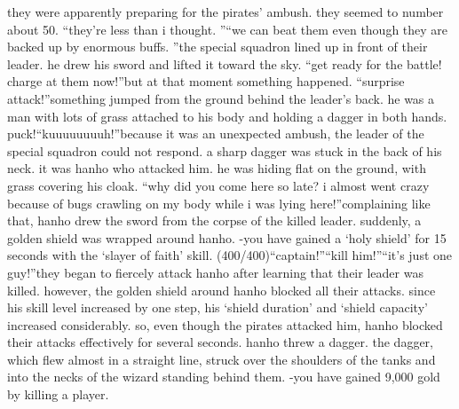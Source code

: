  they were apparently preparing for the pirates’ ambush.
 they seemed to number about 50.
“they’re less than i thought.
”“we can beat them even though they are backed up by enormous buffs.
”the special squadron lined up in front of their leader.
 he drew his sword and lifted it toward the sky.
“get ready for the battle! charge at them now!”but at that moment something happened.
“surprise attack!”something jumped from the ground behind the leader’s back.
 he was a man with lots of grass attached to his body and holding a dagger in both hands.
puck!“kuuuuuuuuh!”because it was an unexpected ambush, the leader of the special squadron could not respond.
 a sharp dagger was stuck in the back of his neck.
it was hanho who attacked him.
 he was hiding flat on the ground, with grass covering his cloak.
“why did you come here so late? i almost went crazy because of bugs crawling on my body while i was lying here!”complaining like that, hanho drew the sword from the corpse of the killed leader.
suddenly, a golden shield was wrapped around hanho.
-you have gained a ‘holy shield’ for 15 seconds with the ‘slayer of faith’ skill.
 (400/400)“captain!”“kill him!”“it’s just one guy!”they began to fiercely attack hanho after learning that their leader was killed.
however, the golden shield around hanho blocked all their attacks.
 since his skill level increased by one step, his ‘shield duration’ and ‘shield capacity’ increased considerably.
so, even though the pirates attacked him, hanho blocked their attacks effectively for several seconds.
hanho threw a dagger.
 the dagger, which flew almost in a straight line, struck over the shoulders of the tanks and into the necks of the wizard standing behind them.
-you have gained 9,000 gold by killing a player.

